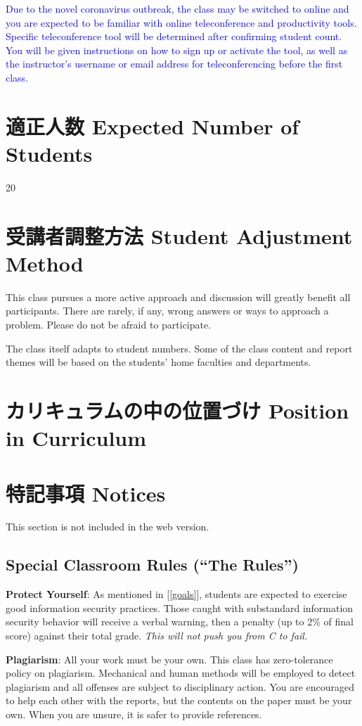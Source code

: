 \documentclass[a4paper]{article}
\begin{document}
\textcolor{blue}{Due to the novel coronavirus outbreak, the class may be switched to online and you are expected to be familiar with online teleconference and productivity tools. Specific teleconference tool will be determined after confirming student count. You will be given instructions on how to sign up or activate the tool, as well as the instructor's username or email address for teleconferencing before the first class.}

\section{適正人数 Expected Number of Students}
20

\section{受講者調整方法 Student Adjustment Method}
This class pursues a more active approach and discussion will greatly benefit all participants. There are rarely, if any, wrong answers or ways to approach a problem. Please do not be afraid to participate.

The class itself adapts to student numbers. Some of the class content and report themes will be based on the students' home faculties and departments.

\section{カリキュラムの中の位置づけ Position in Curriculum}
\section{特記事項 Notices}
This section is not included in the web version.

\subsection{Special Classroom Rules (``The Rules'')}

\textbf{Protect Yourself}: As mentioned in [\ref{goals}], students are expected to exercise good information security practices. Those caught with substandard information security behavior will receive a verbal warning, then a penalty (up to 2\% of final score) against their total grade. \textit{This will not push you from C to fail.}

\smallskip\noindent
\textbf{Plagiarism}: All your work must be your own. This class has zero-tolerance policy on plagiarism. Mechanical and human methods will be employed to detect plagiarism and all offenses are subject to disciplinary action. You are encouraged to help each other with the reports, but the contents on the paper must be your own. When you are unsure, it is safer to provide references.
\end{document}

